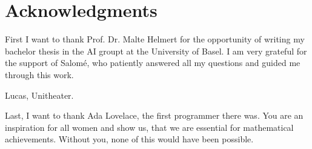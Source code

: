 \chapter{Acknowledgments}
First I want to thank Prof. Dr. Malte Helmert for the opportunity of writing my bachelor thesis in the AI groupt at the University of Basel.
I am very grateful for the support of Salom\'e, who patiently answered all my questions and guided me through this work.

Lucas, Unitheater.

Last, I want to thank Ada Lovelace, the first programmer there was.
You are an inspiration for all women and show us, that we are essential for mathematical achievements.
Without you, none of this would have been possible.
